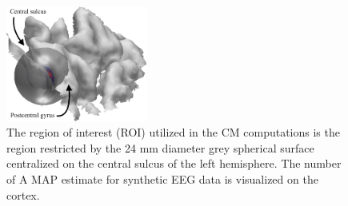 \documentclass[5p]{elsarticle}
\begin{document}
\begin{figure}[h!]
\begin{footnotesize}
\begin{center}
\begin{minipage}{3.9cm} \begin{center}
\includegraphics[height=3.8cm]{ROI.png} 
\end{center}\end{minipage}
\end{center}
\end{footnotesize}
\caption{The region of interest (ROI)  utilized in the CM computations is the region restricted by the 24 mm diameter grey spherical surface centralized on the central sulcus of the left hemisphere. The number of A MAP estimate for synthetic EEG data is visualized on the cortex. }
\label{fig:roi} 
\end{figure}
\end{document}
